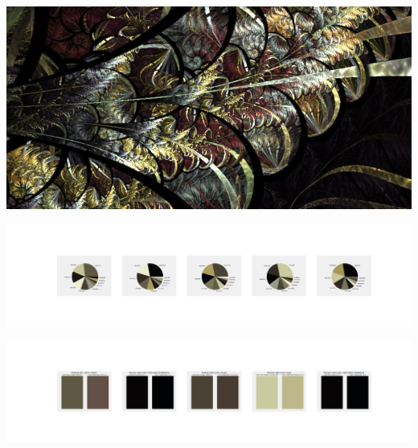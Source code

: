\documentclass[11pt]{article}
\begin{document}
\begin{landscape}
    \begin{center}
    \includegraphics[width=\textwidth]{./nbimg/file (39).jpg}
    \end{center}

    \begin{center}
    \includegraphics[width=250mm]{./nbimg/pie-322.jpg}
    \end{center}

    \begin{center}
    \includegraphics[width=250mm]{./nbimg/peak-322.jpg}
    \end{center}
    


\end{landscape}
\end{document}
